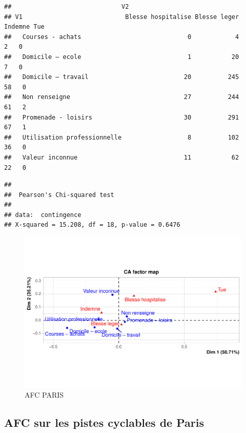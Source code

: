 \documentclass[french,]{compterendu}
\theoremstyle{urcastyle}
\theoremstyle{remark}
\begin{document}
\begin{verbatim}
##                              V2
## V1                            Blesse hospitalise Blesse leger Indemne Tue
##   Courses - achats                             0            4       2   0
##   Domicile – ecole                             1           20       7   0
##   Domicile – travail                          20          245      58   0
##   Non renseigne                               27          244      61   2
##   Promenade - loisirs                         30          291      67   1
##   Utilisation professionnelle                  8          102      36   0
##   Valeur inconnue                             11           62      22   0
\end{verbatim}

\begin{verbatim}
## 
##  Pearson's Chi-squared test
## 
## data:  contingence
## X-squared = 15.208, df = 18, p-value = 0.6476
\end{verbatim}

\begin{figure}[H]

{\centering \includegraphics[width=0.9\linewidth]{Rapport_ADD_LEO-GABET_files/figure-latex/Afc3PARIS-1} 

}

\caption{AFC PARIS}\label{fig:Afc3PARIS}
\end{figure}

\hypertarget{afc-sur-les-pistes-cyclables-de-paris}{%
\subsection{AFC sur les pistes cyclables de Paris}\label{afc-sur-les-pistes-cyclables-de-paris}}
\end{document}
